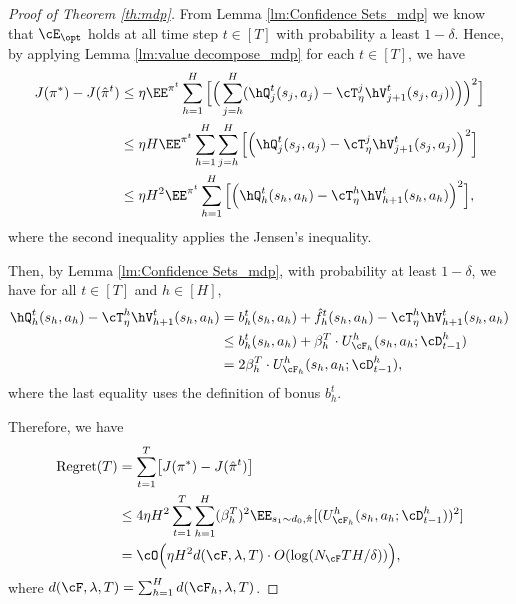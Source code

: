 \documentclass[11pt]{article}
\begin{document}
\begin{proof}[Proof of Theorem \ref{th:mdp}]
From Lemma \ref{lm:Confidence Sets_mdp} we know that $\cE_{\opt}$ holds at all time step $t\in[T]$ with probability a least $1-\delta$. Hence, by applying Lemma \ref{lm:value decompose_mdp} for each $t\in[T]$, we have
\begin{align*}
     J(\pi^*) - J(\hat \pi^t) &\le \eta \EE^{\pi^t} \sum_{h = 1}^H \Big[\Big(\sum_{j=h}^H (\hQ^t_j(s_j,a_j)-\cT_\eta^j \hV^t_{j+1}(s_j,a_j)) \Big)\Big)^2\Big]\\
    &\le \eta H \EE^{\pi^t} \sum_{h = 1}^H \sum_{j=h}^H \Big[\Big(\hQ^t_j(s_j,a_j)-\cT_\eta^j \hV^t_{j+1}(s_j,a_j)\Big)^2\Big]\\
    &\le \eta H^2 \EE^{\pi^t} \sum_{h = 1}^H \Big[\Big(\hQ^t_h(s_h,a_h)-\cT_\eta^h \hV^t_{h+1}(s_h,a_h)\Big)^2\Big],
\end{align*}
where the second inequality applies the Jensen's inequality.

Then, by Lemma \ref{lm:Confidence Sets_mdp}, with probability at least $1 - \delta$, we have for all $t\in[T]$ and $h\in[H]$,
\begin{align*}
    \hQ^t_h(s_h,a_h)-\cT_\eta^h \hV^t_{h+1}(s_h,a_h) &= b^t_h(s_h,a_h) + \hat f^t_h(s_h, a_h) - \cT_\eta^h \hV^t_{h+1}(s_h, a_h)\\
    &\le b^t_h(s_h,a_h) + \beta^T_h\cdot U^h_{\cF_h}(s_h, a_h; \cD^h_{t-1})\\
    &= 2\beta^T_h\cdot U^h_{\cF_h}(s_h, a_h; \cD^h_{t-1}),
\end{align*}
where the last equality uses the definition of bonus $b^t_h$.

Therefore, we have
    \begin{align*}
        \mathrm{Regret}(T) &= \sum_{t = 1}^T \bigl[J(\pi^*) - J(\hat \pi^t)\bigr]
        \\&\le 4 \eta H^2 \sum_{t = 1}^T \sum_{h = 1}^H (\beta^T_h)^2 \EE_{s_1 \sim d_0, \hat \pi}[(U^h_{\cF_h}(s_h, a_h; \cD^h_{t-1}))^2]
        \\&= \cO\Big(\eta H^2 d(\cF,\lambda,T) \cdot O(\log(N_{\cF} TH /\delta))\Big),
    \end{align*}
    where $d(\cF,\lambda,T)=\sum_{h=1}^Hd(\cF_h,\lambda,T)$.
\end{proof}
\end{document}
